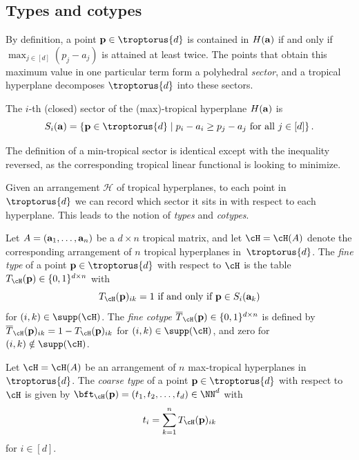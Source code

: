 \subsection{Types and cotypes} 
By definition, a point ${\bf p }\in \troptorus{d}$ is contained in $H({\bf a})$ if and only if $\max_{j \in [d]}(p_j - a_j)$ is attained at least twice. The points that obtain this maximum value in one particular term form a polyhedral \emph{sector}, and a tropical hyperplane decomposes $\troptorus{d}$ into these sectors.

\begin{definition}[Sector]
The $i$-th (closed) sector of the (max)-tropical hyperplane $H({\bf a})$  is
\[
S_i({\bf a}) = \{{\bf p} \in \troptorus{d} \mid p_i - a_i \geq p_j - a_j \ \text{for all} \ j \in [d] \} \, .
\]
\end{definition}
The definition of a min-tropical sector is identical except with the inequality reversed, as the corresponding tropical linear functional is looking to minimize.

Given an arrangement ${\mathcal H}$ of tropical hyperplanes, to each point in $\troptorus{d}$ we can record which sector it sits in with respect to each hyperplane. This leads to the notion of \emph{types} and \emph{cotypes}.

\begin{definition}\label{def: fineType}
Let $A = ({\bf a}_1,\dots, {\bf a}_n)$ be a $d \times n$ tropical matrix, and let $\cH = \cH(A)$ denote the corresponding arrangement of $n$ tropical hyperplanes in~$\troptorus{d}$. The \emph{fine type} of a point ${\bf p} \in \troptorus{d}$ with respect to $\cH$ is the table \mbox{$T_\cH({\bf p})\in\{0,1\}^{d\times n}$} with
$$
T_\cH({\bf p})_{ik} = 1 \text{ if and only if } {\bf p}\in S_i({\bf a}_k)
$$
for $(i,k)\in \supp(\cH)$. The \emph{fine cotype} $\overline{T}_\cH({\bf p})\in\{0,1\}^{d\times n}$ is defined by $\overline{T}_\cH({\bf p})_{ik} = 1-T_\cH({\bf p})_{ik}$ for $(i,k)\in \supp(\cH)$, and zero for $(i,k)\notin \supp(\cH)$.
\end{definition}


\begin{definition}\label{def: coarseType} Let $\cH = \cH(A)$ be an arrangement of $n$ max-tropical hyperplanes in $\troptorus{d}$. The \emph{coarse type} of a point ${\bf p}\in \troptorus{d}$ with respect to $\cH$ is given by $\bft_\cH({\bf p}) = (t_1, t_2,\dots, t_d)\in \NN^d$ with
$$
t_i = \sum_{k=1}^n T_\cH({\bf p})_{ik}
$$
for $i\in [d]$.
\end{definition}


